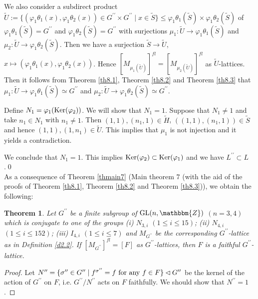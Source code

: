 \documentclass{amsart}
\theoremstyle{plain}
\newtheorem{theorem}{Theorem}[section]
\theoremstyle{definition}
\theoremstyle{remark}
\newcommand{\bZ}{\mathbbm{Z}}\newcommand{\bQ}{\mathbbm{Q}}
\newcommand{\GL}{{\rm GL}}\newcommand{\SL}{{\rm SL}}
\newcounter{sub}\def\tr{\mbox{tr }}
\begin{document}
{We also consider a subdirect product 
$\widetilde{U}:=\{(\varphi_1\theta_1(x),\varphi_1\theta_2(x))\in G^{\prime\prime}\times G^{\prime\prime}\mid x\in \widetilde{S}\}
\leq 
\varphi_1\theta_1(\widetilde{S})\times \varphi_1\theta_2(\widetilde{S})$ 
of $\varphi_1\theta_1(\widetilde{S})=G^{\prime\prime}$ and 
$\varphi_1\theta_2(\widetilde{S})=G^{\prime\prime}$ 
with surjections 
$\mu_1:\widetilde{U}\rightarrow \varphi_1\theta_1(\widetilde{S})$ and 
$\mu_2:\widetilde{U}\rightarrow \varphi_1\theta_2(\widetilde{S})$. 
Then we have a surjection $\widetilde{S}\rightarrow \widetilde{U}$, 
$x\mapsto (\varphi_1\theta_1(x),\varphi_1\theta_2(x))$. 
Hence $[M_{\mu_1(\widetilde{U})}]^{fl}=[M_{\mu_2(\widetilde{U})}]^{fl}$ 
as $\widetilde{U}$-lattices. 
Then it follows from Theorem \ref{th8.1}, 
Theorem \ref{th8.2} and Theorem \ref{th8.3} that 
$\mu_1:\widetilde{U}\rightarrow \varphi_1\theta_1(\widetilde{S})\simeq G^{\prime\prime}$ and 
$\mu_2:\widetilde{U}\rightarrow \varphi_1\theta_2(\widetilde{S})\simeq G^{\prime\prime}$. 

Define $N_1=\varphi_1({\rm Ker}(\varphi_2))$. 
We will show that $N_1=1$. 
Suppose that $N_1\neq 1$ and take $n_1\in N_1$ with $n_1\neq 1$. 
Then $(1,1), (n_1,1)\in \widetilde{H}$, 
$((1,1),(n_1,1))\in \widetilde{S}$ and hence 
$(1,1), (1,n_1)\in \widetilde{U}$. 
This implies that $\mu_1$ is not injection and it yields a contradiction. 

We conclude that $N_1=1$. 
This implies ${\rm Ker}(\varphi_2)\subset {\rm Ker}(\varphi_1)$ 
and we have $L^{\prime\prime}\subset L$.\qed\\

As a consequence of Theorem \ref{thmain7} 
(Main theorem $7$ 
(with the aid of the proofs of Theorem \ref{th8.1}, Theorem \ref{th8.2} 
and Theorem \ref{th8.3})), 
we obtain the following: 

\begin{theorem}\label{th8.6}
Let $G^{\prime\prime}$ be a finite subgroup of $\GL(n,\bZ)$ $(n=3,4)$
which is conjugate to one of the groups 
{\rm (i)} $N_{3,i}$ $(1\leq i\leq 15)$; 
{\rm (ii)} $N_{4,i}$ $(1\leq i\leq 152)$; 
{\rm (iii)} $I_{4,i}$ $(1\leq i\leq 7)$ 
and $M_{G^{\prime\prime}}$ be the corresponding 
$G^{\prime\prime}$-lattice as in Definition \ref{d2.2}. 
If $[M_{G^{\prime\prime}}]^{fl}=[F]$ as $G^{\prime\prime}$-lattices, 
then $F$ is a faithful $G^{\prime\prime}$-lattice. 
\end{theorem}
%
\begin{proof}
Let $N^{\prime\prime}=\{\sigma^{\prime\prime}\in G^{\prime\prime}\mid 
f^{\sigma^{\prime\prime}}=f\ {\rm for\ any}\ f\in F\}
\lhd G^{\prime\prime}$ be the kernel 
of the action of $G^{\prime\prime}$ on $F$, i.e. 
$G^{\prime\prime}/N^{\prime\prime}$ acts on $F$ faithfully. 
We should show that $N^{\prime\prime}=1$. 


\end{proof}}
\end{document}
